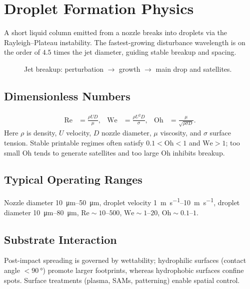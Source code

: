 \documentclass[conference]{IEEEtran}
\newcommand{\Oh}{\mathrm{Oh}}
\newcommand{\We}{\mathrm{We}}
\newcommand{\Rey}{\mathrm{Re}}
\begin{document}
\section{Droplet Formation Physics}
A short liquid column emitted from a nozzle breaks into droplets via the Rayleigh--Plateau instability. The fastest-growing disturbance wavelength is on the order of $4.5$ times the jet diameter, guiding stable breakup and spacing.

\begin{figure}[!t]
  \centering
  
  \caption{Jet breakup: perturbation $\to$ growth $\to$ main drop and satellites.}
  \label{fig:droplet_instability}
\end{figure}

\subsection{Dimensionless Numbers}
\begin{align}
\Rey &= \frac{\rho U D}{\mu}, &
\We  &= \frac{\rho U^2 D}{\sigma}, &
\Oh  &= \frac{\mu}{\sqrt{\rho \sigma D}} .
\end{align}
Here $\rho$ is density, $U$ velocity, $D$ nozzle diameter, $\mu$ viscosity, and $\sigma$ surface tension.
Stable printable regimes often satisfy $0.1<\Oh<1$ and $\We>1$; too small $\Oh$ tends to generate satellites and too large $\Oh$ inhibits breakup.

\subsection{Typical Operating Ranges}
Nozzle diameter \SIrange{10}{50}{\micro\meter}, droplet velocity \SIrange{1}{10}{\meter\per\second}, droplet diameter \SIrange{10}{80}{\micro\meter}, $\Rey\sim10$--$500$, $\We\sim1$--$20$, $\Oh\sim0.1$--$1$.

\subsection{Substrate Interaction}
Post-impact spreading is governed by wettability; hydrophilic surfaces (contact angle $<\SI{90}{\degree}$) promote larger footprints, whereas hydrophobic surfaces confine spots. Surface treatments (plasma, SAMs, patterning) enable spatial control.

\end{document}
